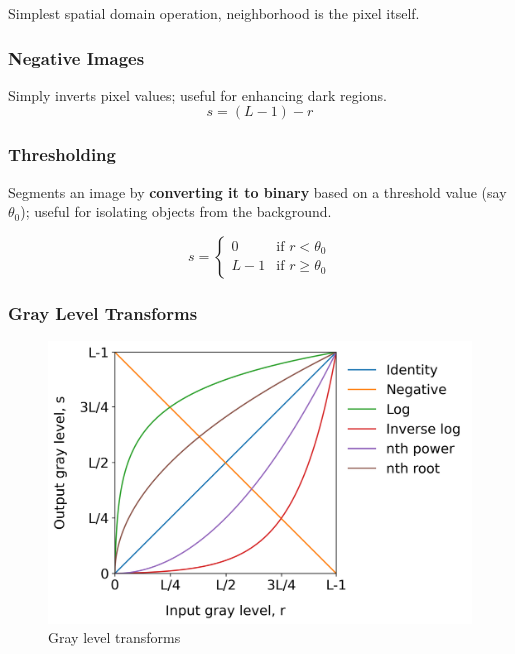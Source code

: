 Simplest spatial domain operation, neighborhood is the pixel itself.

\subsubsection*{Negative Images}

Simply inverts pixel values; useful for enhancing dark regions.
\begin{equation*}
  s = (L - 1) - r
\end{equation*}

\subsubsection*{Thresholding}

Segments an image by \textbf{converting it to binary} based on a
threshold value (say $\theta_0$); useful for isolating objects from
the background.

\begin{equation*}
  s =
  \begin{cases}
    0 & \text{if } r < \theta_0 \\
    L - 1 & \text{if } r \geq \theta_0
  \end{cases}
\end{equation*}

\subsubsection*{Gray Level Transforms}

\begin{figure}[H]
  \centering
  \includegraphics[width=\linewidth]{images/gray_level_transforms.png}
  \caption{Gray level transforms}
\end{figure}

